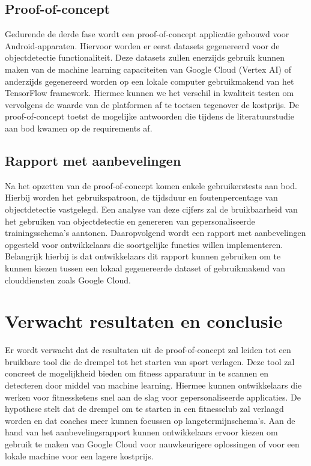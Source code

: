 \subsection{Proof-of-concept}
\label{subsec:poc}
Gedurende de derde fase wordt een proof-of-concept applicatie gebouwd voor Android-apparaten. %
Hiervoor worden er eerst datasets gegenereerd voor de objectdetectie functionaliteit.
Deze datasets zullen enerzijds gebruik kunnen maken van de machine learning capaciteiten van Google Cloud (Vertex AI) of anderzijds gegenereerd worden op een lokale computer gebruikmakend van het TensorFlow framework.
Hiermee kunnen we het verschil in kwaliteit testen om vervolgens de waarde van de platformen af te toetsen tegenover de kostprijs.
De proof-of-concept toetst de mogelijke antwoorden die tijdens de literatuurstudie aan bod kwamen op de requirements af.

\subsection{Rapport met aanbevelingen}
\label{subsec:result-of-poc}
Na het opzetten van de proof-of-concept komen enkele gebruikerstests aan bod. %
Hierbij worden het gebruikspatroon, de tijdsduur en foutenpercentage van objectdetectie vastgelegd.
Een analyse van deze cijfers zal de bruikbaarheid van het gebruiken van objectdetectie en genereren van gepersonaliseerde trainingsschema's aantonen.
Daaropvolgend wordt een rapport met aanbevelingen opgesteld voor ontwikkelaars die soortgelijke functies willen implementeren.
Belangrijk hierbij is dat ontwikkelaars dit rapport kunnen gebruiken om te kunnen kiezen tussen een lokaal gegenereerde dataset of gebruikmakend van clouddiensten zoals Google Cloud.

\section{Verwacht resultaten en conclusie}
\label{sec:verwacht-resultaten-en-conclusie}
Er wordt verwacht dat de resultaten uit de proof-of-concept zal leiden tot een bruikbare tool die de drempel tot het starten van sport verlagen.
Deze tool zal concreet de mogelijkheid bieden om fitness apparatuur in te scannen en detecteren door middel van machine learning.
Hiermee kunnen ontwikkelaars die werken voor fitnessketens snel aan de slag voor gepersonaliseerde applicaties.
De hypothese stelt dat de drempel om te starten in een fitnessclub zal verlaagd worden en dat coaches meer kunnen focussen op langetermijnschema's.
Aan de hand van het aanbevelingsrapport kunnen ontwikkelaars ervoor kiezen om gebruik te maken van Google Cloud voor nauwkeurigere oplossingen of voor een lokale machine voor een lagere kostprijs.